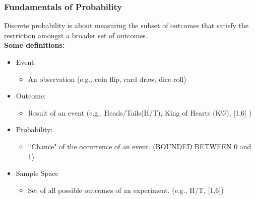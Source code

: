 \documentclass[12pt]{beamer}
\begin{document}
	\begin{frame}
		\frametitle{Fundamentals of Probability}
		Discrete probability is about measuring the subset of outcomes that satisfy the restriction amongst a broader set of outcomes.\\
		\textbf{Some definitions:}
		\begin{itemize}
			\item Event:
			\begin{itemize}
				\item An observation (e.g., coin flip, card draw, dice roll)
			\end{itemize}
			\item Outcome: 
			\begin{itemize}
				\item Result of an event (e.g., Heads/Tails(H/T), King of Hearts (K$\heartsuit$), [1,6] )
			\end{itemize}
			\item Probability:
			\begin{itemize}
				\item ``Chance" of the occurrence of an event. (BOUNDED BETWEEN 0 and 1)
			\end{itemize}
			\item Sample Space
			\begin{itemize}
				\item Set of all possible outcomes of an experiment. (e.g., H/T, [1,6])
			\end{itemize}
		\end{itemize}
	\end{frame}
\end{document}
